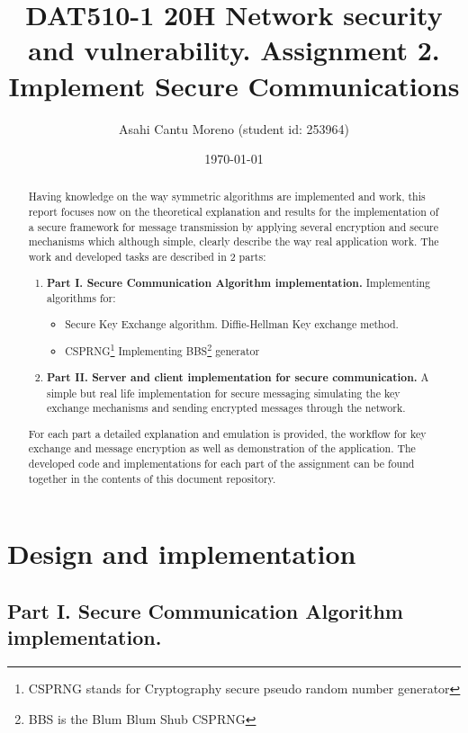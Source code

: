 \documentclass[letterpaper,12pt]{article}
\begin{document}
\title{DAT510-1 20H Network security and vulnerability. Assignment 2. Implement Secure Communications}
\author{Asahi Cantu Moreno (student id: 253964)}
\date{\today}
\maketitle

\begin{abstract}
Having knowledge on the way symmetric algorithms are implemented and work, this report focuses now on the theoretical explanation and results for the implementation of a secure framework for message transmission by applying several encryption and secure mechanisms which although simple, clearly describe the way real application work. The work and developed tasks are described in 2 parts:
\begin{enumerate}
    \item \textbf{Part I. Secure Communication Algorithm implementation.}
    Implementing algorithms for:
    \begin{itemize}
        \item Secure Key Exchange algorithm. Diffie-Hellman Key exchange method.
        \item CSPRNG\footnote{CSPRNG stands for Cryptography secure pseudo random number generator }  Implementing BBS\footnote{BBS is the Blum Blum Shub CSPRNG} generator
    \end{itemize}
    
    \item \textbf{Part II. Server and client implementation for secure communication.} A simple but real life implementation for secure messaging simulating the key exchange mechanisms and sending encrypted messages through the network.
\end{enumerate}
For each part a detailed explanation and emulation is provided, the workflow for key exchange and message encryption as well as demonstration of the application.
The developed code and implementations for each part of the assignment can be found together in the contents of this document repository.
\end{abstract}
\newpage

\section{Design and implementation}
\subsection{Part I. Secure Communication Algorithm implementation.}
\end{document}
